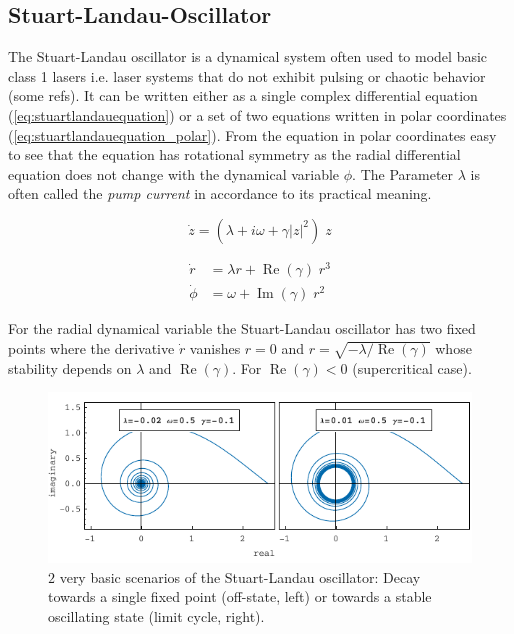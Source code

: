 	
	

\subsection{Stuart-Landau-Oscillator}
	The Stuart-Landau oscillator is a dynamical system often used to model basic class 1 lasers i.e. laser systems that do not exhibit pulsing or chaotic behavior (some refs). It can be written either as a single complex differential equation (\ref{eq:stuartlandauequation}) or a set of two equations written in polar coordinates (\ref{eq:stuartlandauequation_polar}). From the equation in polar coordinates easy to see that the equation has rotational symmetry as the radial differential equation does not change with the dynamical variable $\phi$. The Parameter $\lambda$ is often called the \emph{pump current} in accordance to its practical meaning.

\begin{equation}	
	\dot{z} = (\lambda +  i \omega + \gamma |z|^2 ) \; z
	\label{eq:stuartlandauequation}		
\end{equation}

\begin{equation}
	\begin{split}
	\dot{r} & = \lambda r + \operatorname{Re} (\gamma) \; r^{3} \\
	\dot{\phi} &= \omega + \operatorname{Im}(\gamma) \; r^{2} 
	\end{split}
	\label{eq:stuartlandauequation_polar}
\end{equation}

	For the radial dynamical variable the Stuart-Landau oscillator has two fixed points where the derivative $\dot{r}$ vanishes $r = 0$ and $r = \sqrt{-\lambda /\operatorname{Re}(\gamma)}$ whose stability depends on $\lambda$ and $\operatorname{Re}(\gamma)$. For $\operatorname{Re}(\gamma) < 0 $ (supercritical case).


\begin{figure}
	\centering
	\includegraphics[width=0.99\linewidth]{pics/stuart_landau_complex_Focus_LC}
	\caption{$2$ very basic scenarios of the Stuart-Landau oscillator: Decay towards a single fixed point (off-state, left) or towards a stable oscillating state (limit cycle, right).}
	\label{fig:stuart_spiral}
\end{figure}


